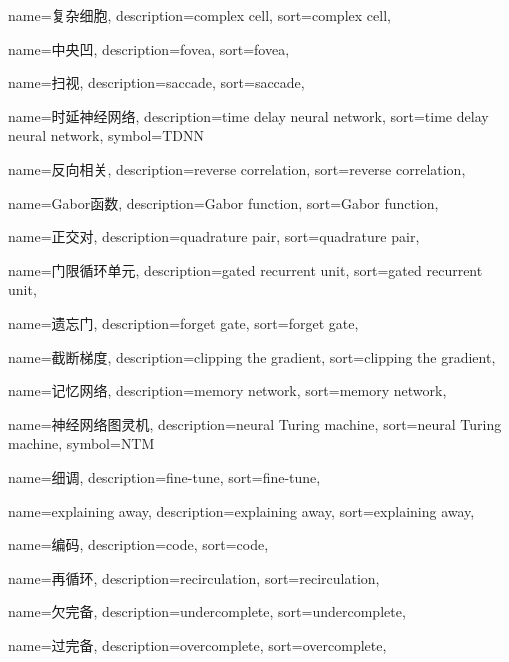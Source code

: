 {
  name=复杂细胞,
  description={complex cell},
  sort={complex cell},
}

{
  name=中央凹,
  description={fovea},
  sort={fovea},
}

{
  name=扫视,
  description={saccade},
  sort={saccade},
}

{
  name=时延神经网络,
  description={time delay neural network},
  sort={time delay neural network},
  symbol={TDNN}
}

{
  name=反向相关,
  description={reverse correlation},
  sort={reverse correlation},
}

{
  name=Gabor函数,
  description={Gabor function},
  sort={Gabor function},
}

{
  name=正交对,
  description={quadrature pair},
  sort={quadrature pair},
}

{
  name=门限循环单元,
  description={gated recurrent unit},
  sort={gated recurrent unit},
}

{
  name=遗忘门,
  description={forget gate},
  sort={forget gate},
}

{
  name=截断梯度,
  description={clipping the gradient},
  sort={clipping the gradient},
}

{
  name=记忆网络,
  description={memory network},
  sort={memory network},
}

{
  name=神经网络图灵机,
  description={neural Turing machine},
  sort={neural Turing machine},
  symbol={NTM}
}

{
  name=细调,
  description={fine-tune},
  sort={fine-tune},
}

{
  name=explaining away,
  description={explaining away},
  sort={explaining away},
}

{
  name=编码,
  description={code},
  sort={code},
}

{
  name=再循环,
  description={recirculation},
  sort={recirculation},
}

{
  name=欠完备,
  description={undercomplete},
  sort={undercomplete},
}

{
  name=过完备,
  description={overcomplete},
  sort={overcomplete},
}

